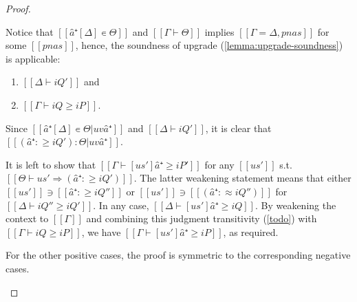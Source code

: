 \begin{proof}
\begin{caseof}
    Notice that $[[â⁺[Δ] ∊ Θ]]$ and $[[Γ ⊢ Θ]]$ 
    implies $[[Γ = Δ, pnas]]$ for some $[[pnas]]$, hence, the
    soundness of upgrade (\cref{lemma:upgrade-soundness}) is applicable:
    \begin{enumerate}
        \item $[[Δ ⊢ iQ']]$ and
        \item $[[Γ ⊢ iQ ≥ iP]]$.
    \end{enumerate}

    Since $[[â⁺[Δ] ∊ Θ|uv â⁺]]$ and $[[Δ ⊢ iQ']]$, it is clear that $[[(â⁺ :≥ iQ') : Θ | uv â⁺ ]]$.

    It is left to show that $[[Γ ⊢ [us']â⁺ ≥ iP']]$ for any $[[us']]$ s.t. $[[Θ ⊢ us' ⇒ (â⁺ :≥ iQ')]]$.
    The latter weakening statement means that either $[[us']] \ni [[â⁺ :≥ iQ'']]$ or
    $[[us']] \ni [[(â⁺ :≈ iQ'')]]$ for $[[Δ ⊢ iQ'' ≥ iQ']]$. In any case,
    $[[Δ ⊢ [us']â⁺ ≥ iQ]]$. By weakening the context to $[[Γ]]$ and combining this judgment
    transitivity (\cref{todo}) with $[[Γ ⊢ iQ ≥ iP]]$, we have $[[Γ ⊢ [us']â⁺ ≥ iP]]$,
    as required. 

    \item For the other positive cases, the proof is symmetric to the corresponding negative cases.
    \end{caseof}
\end{proof}

